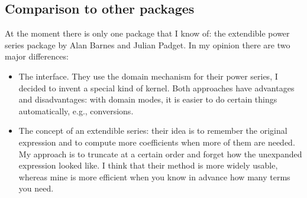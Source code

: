 \subsection{Comparison to other packages}

At the moment there is only one \REDUCE{} package that I know of:
the extendible power series package by Alan Barnes and Julian Padget.
In my opinion there are two major differences:
\begin{itemize}
  \item The interface. They use the domain mechanism for their power
        series, I decided to invent a special kind of kernel. Both
        approaches have advantages and disadvantages: with domain
        modes, it is easier
        to do certain things automatically, e.g., conversions.
  \item The concept of an extendible series: their idea is to remember
        the original expression and to compute more coefficients when
        more of them are needed. My approach is to truncate at a
        certain order and forget how the unexpanded expression
        looked like.  I think that their method is more widely
        usable, whereas mine is more efficient when you know in
        advance how many terms you need.
\end{itemize}

